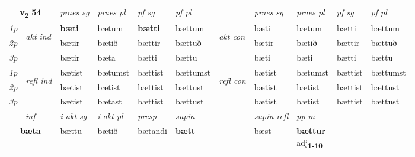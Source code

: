 \noindent
\begin{tabular}{lllllllllll} \toprule
\multicolumn{2}{c}{\textbf{v{\textsubscript{2}}} \Large{\textbf{54}}}  &  \textit{praes sg}  & \textit{praes pl}  &\textit{ pf sg} & \textit{pf pl} &  &  \textit{praes sg}  & \textit{praes pl}  & \textit{pf sg} & \textit{pf pl } \\*
	\cmidrule{3-6} \cmidrule{8-11}
 {\textit{1p}} & \multirow{3}{*}{\begin{turn}{90}\textit{akt ind}\end{turn}} & \textbf{bæti} & bætum & \textbf{bætti} & bættum & \multirow{3}{*}{\begin{turn}{90}\textit{akt con}\end{turn}} &bæti & bætum & bætti & bættum\\*
 {\textit{2p}} &  &  bætir  & bætið & bættir & bættuð & & bætir & bætið & bættir & bættuð \\*
{\textit{3p}} &  & bætir & bæta & bætti & bættu & & bæti & bæti& bætti & bættu \\*
\cmidrule{3-6} \cmidrule{8-11}
 {\textit{1p}} & \multirow{3}{*}{\begin{turn}{90}\textit{refl ind}\end{turn}}  & bætist & bætumst & bættist & bættumst & \multirow{3}{*}{\begin{turn}{90}\textit{refl con}\end{turn}}  &bætist & bætumst & bættist & bættumst \\*
 {\textit{2p}} &  & bætist & bætist & bættist & bættust & &bætist & bætist & bættist & bættust \\*
 {\textit{3p}}  & & bætist & bætast & bættist & bættust & & bætist & bætist& bættist & bættust \\*
\cmidrule{3-6} \cmidrule{8-11}

   \multicolumn{2}{c}{\textit{inf}}  & \textit{i akt sg} & \textit{i akt pl}   & \textit{presp} & \textit{supin} && \textit{supin refl} & \textit{pp m} \\*
  \multicolumn{2}{c}{\textbf{bæta}} & bættu  & bætið   & bætandi &  \textbf{bætt} && bæst & \specialcell{\textbf{bættur} \\ adj\textbf{\textsubscript{1-10}}} \\*
\end{tabular}

